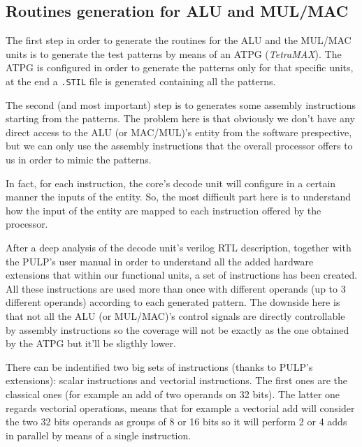 \documentclass[paper=a4, fontsize=10pt]{scrartcl}	%
\begin{document}
	\subsection{Routines generation for ALU and MUL/MAC}
	The first step in order to generate the routines for the ALU and the MUL/MAC units is to generate the test patterns by means of an ATPG (\textit{TetraMAX}). The ATPG is configured in order to generate the patterns only for that specific units, at the end a \texttt{.STIL} file is generated containing all the patterns. \newline

	The second (and most important) step is to generates some assembly instructions starting from the patterns. The problem here is that obviously we don't have any direct access to the ALU (or MAC/MUL)'s entity from the software prespective, but we can only use the assembly instructions that the overall processor offers to us in order to mimic the patterns. \newline
	
	In fact, for each instruction, the core's decode unit will configure in a certain manner the inputs of the entity. So, the most difficult part here is to understand how the input of the entity are mapped to each instruction offered by the processor. \newline

	After a deep analysis of the decode unit's verilog RTL description, together with the PULP's user manual in order to understand all the added hardware extensions that within our functional units, a set of instructions has been created. All these instructions are used more than once with different operands (up to 3 different operands) according to each generated pattern. The downside here is that not all the ALU (or MUL/MAC)'s control signals are directly controllable by assembly instructions so the coverage will not be exactly as the one obtained by the ATPG but it'll be sligthly lower. \newline
	
	There can be indentified two big sets of instructions (thanks to PULP's extensions): scalar instructions and vectorial instructions. The first ones are the classical ones (for example an add of two operands on 32 bits). The latter one regards vectorial operations, means that for example a vectorial add will consider the two 32 bits operands as groups of 8 or 16 bits so it will perform 2 or 4 adds in parallel by means of a single instruction. \newline
\end{document}
